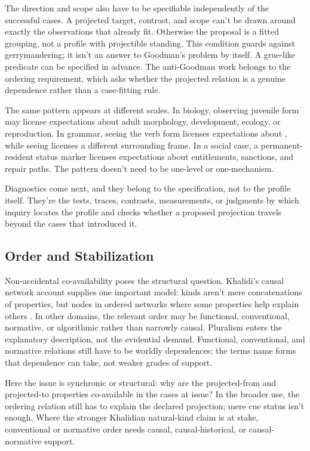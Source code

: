 \documentclass[12pt]{article}
\begin{document}
The direction and scope also have to be specifiable independently of the
successful cases. A projected target, contrast, and scope can't be drawn around
exactly the observations that already fit. Otherwise the proposal is a fitted
grouping, not a profile with projectible standing.
This condition guards against gerrymandering; it isn't an answer to Goodman's
problem by itself. A grue-like predicate can be specified in advance. The
anti-Goodman work belongs to the ordering requirement, which asks whether the
projected relation is a genuine dependence rather than a case-fitting rule.

The same pattern appears at different scales. In biology, observing juvenile form
may license expectations about adult morphology, development, ecology, or
reproduction. In grammar, seeing the verb form  licenses
expectations about , while seeing  licenses a
different surrounding frame. In a social case, a permanent-resident status marker
licenses expectations about entitlements, sanctions, and repair paths. The
pattern doesn't need to be one-level or one-mechanism.

Diagnostics come next, and they belong to the specification, not to the profile
itself. They're the tests, traces, contrasts, measurements, or judgments by
which inquiry locates the profile and checks whether a proposed projection
travels beyond the cases that introduced it.

\subsection{Order and Stabilization}

Non-accidental co-availability poses the structural question. Khalidi's causal
network account supplies one important model: kinds aren't mere concatenations
of properties, but nodes in ordered networks where some properties help explain
others \citep{khalidi2018nodes}. In other domains, the relevant order may be
functional, conventional, normative, or algorithmic rather than narrowly causal.
Pluralism enters the explanatory description, not the evidential demand.
Functional, conventional, and normative relations still have to be worldly
dependences; the terms name forms that dependence can take, not weaker grades of
support.

Here the issue is synchronic or structural: why are the
projected-from and projected-to properties co-available in the cases at issue?
In the broader use, the ordering relation still has to explain the declared
projection; mere cue status isn't enough. Where the stronger Khalidian
natural-kind claim is at stake, conventional or normative order needs causal,
causal-historical, or causal-normative support.
\end{document}
